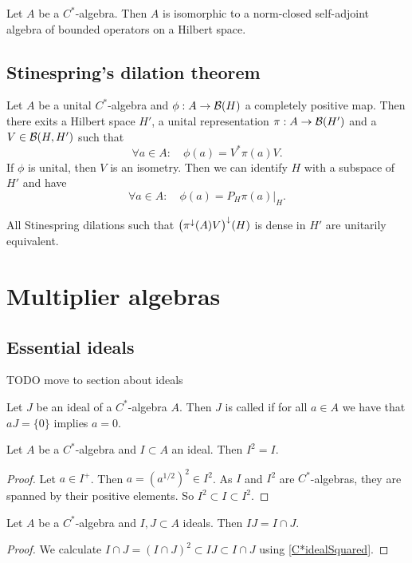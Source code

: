 \begin{theorem}
Let $A$ be a $C^*$-algebra. Then $A$ is isomorphic to a norm-closed self-adjoint algebra of bounded operators on a Hilbert space.
\end{theorem}

\subsection{Stinespring's dilation theorem}
\begin{theorem}
Let $A$ be a unital $C^*$-algebra and $\phi: A\to \operatorname{\mathcal{B}}(H)$ a completely positive map. Then there exits a Hilbert space $H'$, a unital representation $\pi: A\to \operatorname{\mathcal{B}}(H')$ and a $V\in \operatorname{\mathcal{B}}(H,H')$ such that
\[ \forall a\in A: \quad \phi(a) = V^*\pi(a)V. \]
If $\phi$ is unital, then $V$ is an isometry. Then we can identify $H$ with a subspace of $H'$ and have
\[ \forall a\in A: \quad \phi(a) = P_H\pi(a)|_H. \]
\end{theorem}

\begin{proposition}
All Stinespring dilations such that $\big(\pi^\downarrow(A)V\big)^\downarrow(H)$ is dense in $H'$ are unitarily equivalent.
\end{proposition}

\section{Multiplier algebras}
\subsection{Essential ideals}
TODO move to section about ideals
\begin{definition}
Let $J$ be an ideal of a $C^*$-algebra $A$. Then $J$ is called  if for all $a\in A$ we have that $aJ = \{0\}$ implies $a=0$.
\end{definition}

\begin{lemma} \label{C*idealSquared}
Let $A$ be a $C^*$-algebra and $I\subset A$ an ideal. Then $I^2 = I$.
\end{lemma}
\begin{proof}
Let $a\in I^+$. Then $a = (a^{1/2})^2\in I^2$. As $I$ and $I^2$ are $C^*$-algebras, they are spanned by their positive elements. So $I^2 
\subset I \subset I^2$.
\end{proof}
\begin{lemma} \label{productC*ideals}
Let $A$ be a $C^*$-algebra and $I,J\subset A$ ideals. Then $IJ = I\cap J$.
\end{lemma}
\begin{proof}
We calculate $I\cap J = (I\cap J)^2 \subset IJ \subset I\cap J$ using \ref{C*idealSquared}.
\end{proof}

